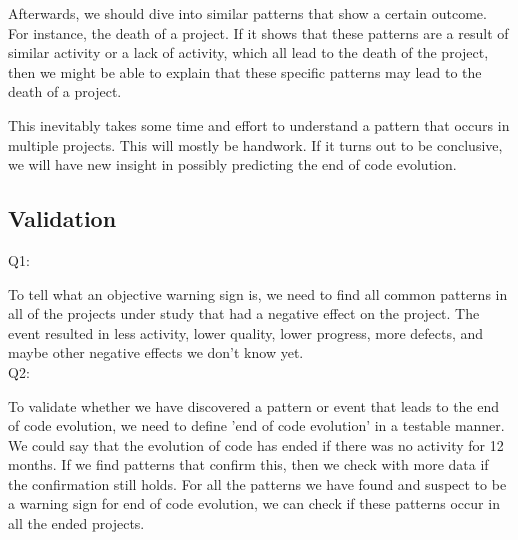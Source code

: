 Afterwards, we should dive into similar patterns that show a certain outcome.
For instance, the death of a project. If it shows that these patterns are a
result of similar activity or a lack of activity, which all lead to the death of
the project, then we might be able to explain that these specific patterns may
lead to the death of a project.

This inevitably takes some time and effort to understand a pattern that occurs
in multiple projects. This will mostly be handwork. If it turns out to be
conclusive, we will have new insight in possibly predicting the end of code
evolution.

\subsection{Validation}
\noindent
Q1: \emph{\subQuestionOne}

To tell what an objective warning sign is, we need to find all common patterns
in all of the projects under study that had a negative effect on the project.
The event resulted in less activity, lower quality, lower progress, more
defects, and maybe other negative effects we don't know yet.
\\

\noindent
Q2: \emph{\subQuestionTwo}

To validate whether we have discovered a pattern or event that leads to the end
of code evolution, we need to define 'end of code evolution' in a testable
manner. We could say that the evolution of code has ended if there was no
activity for 12 months. If we find patterns that confirm this, then we check
with more data if the confirmation still holds. For all the patterns we have
found and suspect to be a warning sign for end of code evolution, we can check
if these patterns occur in all the ended projects.
